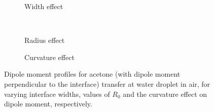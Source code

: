 \begin{figure}[tb]
  \centering
  \begin{subfigure}[t]{.49\linewidth}
  \centering
  \caption{Width effect}
  \label{fig:profile_dipole_acetone_width}
  \end{subfigure}
  ~
  \begin{subfigure}[t]{.49\linewidth}
  \centering
  \caption{Radius effect}
  \label{fig:profile_dipole_acetone_fullprofile}
  \end{subfigure}

  \begin{subfigure}[t]{.49\linewidth}
  \centering
  \caption{Curvature effect}
  \label{fig:profile_dipole_acetone_curvature}
  \end{subfigure}
  \caption[Width, radius and curvature effect on the dipole moment of acetone for water-air droplet phase transfer.]
  {Dipole moment profiles for acetone (with dipole moment
  perpendicular to the interface) transfer at water droplet in air, for
  varying interface widths, values of $R_0$ and the curvature effect on
  dipole moment, respectively.}
  \label{fig:profile_dipole_acetone}
\end{figure}
